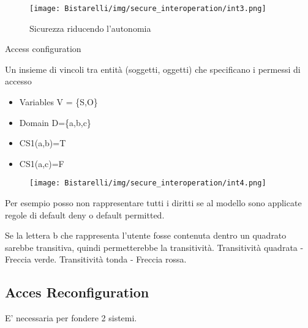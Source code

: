\begin{figure}[H]
	\centering
    \texttt{[image: Bistarelli/img/secure\_interoperation/int3.png]}
    \caption{Sicurezza riducendo l'autonomia}
\end{figure}
Access configuration

Un insieme di vincoli tra entità (soggetti, oggetti) che specificano i permessi di accesso
\begin{itemize}
    \item Variables V = \{S,O\}
    
    \item Domain D=\{a,b,c\}
    
    \item  CS1(a,b)=T
    
    \item CS1(a,c)=F
\end{itemize}
\begin{figure}[H]
	\centering
    \texttt{[image: Bistarelli/img/secure\_interoperation/int4.png]}
\end{figure}
Per esempio posso non rappresentare tutti i diritti se al modello sono applicate regole di default deny o default
permitted.

\singlespacing

Se la lettera b che rappresenta l’utente fosse contenuta dentro un quadrato sarebbe transitiva, quindi
permetterebbe la transitività. Transitività quadrata - Freccia verde. Transitività tonda - Freccia rossa.

\subsection{Acces Reconfiguration}

E' necessaria per fondere 2 sistemi.

\singlespacing

